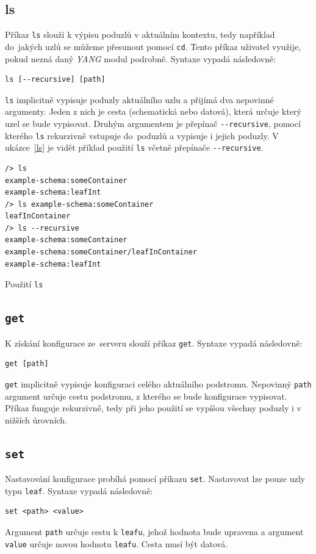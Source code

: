 \documentclass[thesis=B,czech,hidelinks]{FITthesis}[2019/03/06]
\begin{document}
\subsection{ls}
Příkaz \texttt{ls} slouží k výpisu poduzlů v aktuálním kontextu, tedy například do~jakých uzlů se můžeme přesunout pomocí \texttt{cd}. Tento příkaz uživatel využije, pokud nezná daný \textit{YANG} modul podrobně. Syntaxe vypadá následovně:
\begin{verbatim}
ls [--recursive] [path]
\end{verbatim}
\texttt{ls} implicitně vypisuje poduzly aktuálního uzlu a přijímá dva nepovinné argumenty. Jeden z nich je cesta (schematická nebo datová), která určuje který uzel se bude vypisovat. Druhým argumentem je přepínač \verb¨--recursive¨, pomocí kterého \texttt{ls} rekurzivně vstupuje do~poduzlů a vypisuje i jejich poduzly. V ukázce~\ref{ls} je vidět příklad použití \texttt{ls} včetně přepínače \verb¨--recursive¨.

\begin{listing}[H]
\begin{verbatim}
/> ls
example-schema:someContainer
example-schema:leafInt
/> ls example-schema:someContainer
leafInContainer
/> ls --recursive
example-schema:someContainer
example-schema:someContainer/leafInContainer
example-schema:leafInt
\end{verbatim}
\caption{Použití \texttt{ls}}\label{ls}
\end{listing}
\subsection{\texttt{get}}

K získání konfigurace ze~serveru slouží příkaz \texttt{get}. Syntaxe vypadá následovně:
\begin{verbatim}
get [path]
\end{verbatim}
\texttt{get} implicitně vypisuje konfiguraci celého aktuálního podstromu. Nepovinný \texttt{path} argument určuje cestu podstromu, z kterého se bude konfigurace vypisovat. Příkaz funguje rekurzivně, tedy při jeho použití se vypíšou všechny poduzly i v nižších úrovních.

\subsection{\texttt{set}}
Nastavování konfigurace probíhá pomocí příkazu \texttt{set}. Nastavovat lze pouze uzly typu \texttt{leaf}. Syntaxe vypadá následovně:
\begin{verbatim}
set <path> <value>
\end{verbatim}
Argument \texttt{path} určuje cestu k \texttt{leafu}, jehož hodnota bude upravena a argument \texttt{value} určuje novou hodnotu \texttt{leafu}. Cesta musí být datová.
\end{document}
